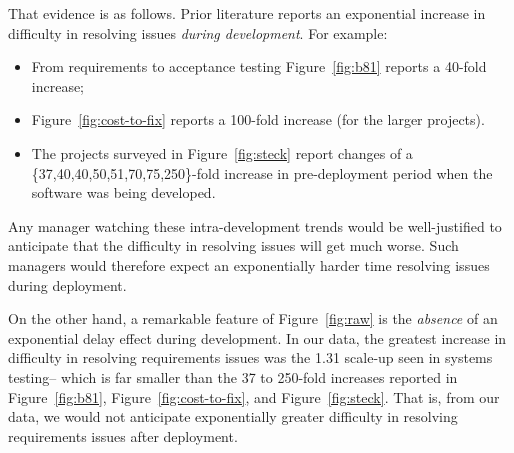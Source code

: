\documentclass{sig-alternate}
\newcommand{\bi}{\begin{itemize}}%
\newcommand{\ei}{\end{itemize}}
\newcommand{\fig}[1]{Figure~\ref{fig:#1}}
\begin{document}
That evidence is as follows.
Prior literature reports an  exponential increase in difficulty in resolving issues {\em during
development}.
For example:
\bi
\item  From requirements to acceptance testing
\fig{b81} reports a 40-fold increase;
\item
 \fig{cost-to-fix} reports a 100-fold increase
(for the larger projects).
\item
The projects surveyed in \fig{steck} report changes of a  \newline
\{37,40,40,50,51,70,75,250\}-fold increase in pre-deployment period when the software was being developed.
\ei
Any manager watching  these intra-development trends would be well-justified
to anticipate that  the difficulty in resolving issues  will get much worse. Such managers
would therefore expect an exponentially harder time resolving issues during deployment.

On the other hand, a remarkable feature of Figure~\ref{fig:raw} is the {\em absence}
of an exponential delay effect during development.
In our data, the greatest increase in difficulty in resolving requirements issues was the 1.31 scale-up seen in systems testing--
which is far smaller than the 37 to 250-fold increases reported in \fig{b81}, \fig{cost-to-fix},
and \fig{steck}.  That is, from our  data, we would not anticipate exponentially greater difficulty in resolving requirements issues after
deployment. 
\end{document}
